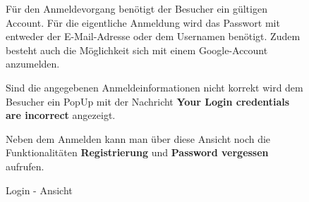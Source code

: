 \begin{figure}[H]
\begin{minipage}{.4\textwidth}
\begin{center}
        \end{center}
        \caption{Login - Ansicht}
        \label{fig:login}
    \end{minipage}%
    \begin{minipage}{.6\textwidth}
        \begin{changemargin}{0.5cm}{0cm}            
        Für den Anmeldevorgang benötigt der Besucher ein gültigen Account. Für die eigentliche Anmeldung wird das Passwort mit entweder der E-Mail-Adresse oder dem Usernamen benötigt. Zudem besteht auch die Möglichkeit sich mit einem Google-Account anzumelden.
        
        Sind die angegebenen Anmeldeinformationen nicht korrekt wird dem Besucher ein PopUp mit der Nachricht \glqq \textbf{Your Login credentials are incorrect}\grqq{} angezeigt.

        Neben dem Anmelden kann man über diese Ansicht noch die Funktionalitäten \glqq \textbf{Registrierung}\grqq{} und \glqq \textbf{Password vergessen}\grqq{} aufrufen.
        \end{changemargin}
    \end{minipage}
\end{figure}

